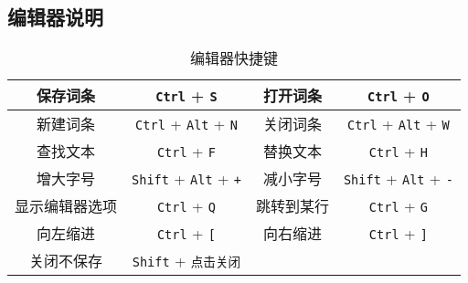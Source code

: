 \subsection{编辑器说明}
\begin{table}[ht]
\centering
\caption{编辑器快捷键}\label{tab_editor_1}
\begin{tabular}{|c|c|c|c|}
\hline
保存词条 & \verb|Ctrl| + \verb|S| & 打开词条 & \verb|Ctrl| + \verb|O| \\
\hline
新建词条 & \verb|Ctrl| + \verb|Alt| + \verb|N| & 关闭词条 & \verb|Ctrl| + \verb|Alt| + \verb|W| \\
\hline
查找文本 & \verb|Ctrl| + \verb|F| & 替换文本 & \verb|Ctrl| + \verb|H| \\
\hline
增大字号 & \verb|Shift| + \verb|Alt| + \verb|+| & 减小字号 & \verb|Shift| + \verb|Alt| + \verb|-| \\
\hline
显示编辑器选项 & \verb|Ctrl| + \verb|Q| & 跳转到某行 & \verb|Ctrl| + \verb|G| \\
\hline
向左缩进 & \verb|Ctrl| + \verb|[| & 向右缩进 & \verb|Ctrl| + \verb|]| \\
\hline
关闭不保存 & \verb|Shift| + \verb|点击关闭| &  &  \\
\hline
\end{tabular}
\end{table}

